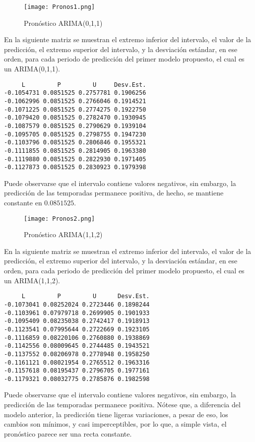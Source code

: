 \documentclass{article}
\theoremstyle{remark}
\begin{document}
\begin{figure}[H] 
\centering
\texttt{[image: Pronos1.png]}
\caption{Pronóstico ARIMA(0,1,1)}
\label{Pronos1}
\end{figure}

En la siguiente matriz se muestran el extremo inferior del intervalo, el valor de la predicción,  el extremo superior del intervalo, y la desviación estándar, en ese orden, para cada periodo de predicción del primer modelo propuesto, el cual es un ARIMA(0,1,1).
\begin{verbatim}
     L         P         U     Desv.Est.
-0.1054731 0.0851525 0.2757781 0.1906256
-0.1062996 0.0851525 0.2766046 0.1914521
-0.1071225 0.0851525 0.2774275 0.1922750
-0.1079420 0.0851525 0.2782470 0.1930945
-0.1087579 0.0851525 0.2790629 0.1939104
-0.1095705 0.0851525 0.2798755 0.1947230
-0.1103796 0.0851525 0.2806846 0.1955321
-0.1111855 0.0851525 0.2814905 0.1963380
-0.1119880 0.0851525 0.2822930 0.1971405
-0.1127873 0.0851525 0.2830923 0.1979398
\end{verbatim}
Puede observarse que el intervalo contiene valores negativos, sin embargo, la predicción de las temporadas permanece positiva, de hecho, se mantiene constante en \(0.0851525\).
\begin{figure}[H] 
\centering
\texttt{[image: Pronos2.png]}
\caption{Pronóstico ARIMA(1,1,2)}
\label{Pronos2}
\end{figure}
En la siguiente matriz se muestran el extremo inferior del intervalo, el valor de la predicción,  el extremo superior del intervalo, y la desviación estándar, en ese orden, para cada periodo de predicción del primer modelo propuesto, el cual es un ARIMA(1,1,2).
\begin{verbatim}
     L         P         U      Desv.Est.
-0.1073041 0.08252024 0.2723446 0.1898244
-0.1103961 0.07979718 0.2699905 0.1901933
-0.1095409 0.08235038 0.2742417 0.1918913
-0.1123541 0.07995644 0.2722669 0.1923105
-0.1116859 0.08220106 0.2760880 0.1938869
-0.1142556 0.08009645 0.2744485 0.1943521
-0.1137552 0.08206978 0.2778948 0.1958250
-0.1161121 0.08021954 0.2765512 0.1963316
-0.1157618 0.08195437 0.2796705 0.1977161
-0.1179321 0.08032775 0.2785876 0.1982598     
\end{verbatim}
Puede observarse que el intervalo contiene valores negativos, sin embargo, la predicción de las temporadas permanece positiva. Nótese que, a diferencia del modelo anterior, la predicción tiene ligeras variaciones, a pesar de eso, los cambios son mínimos, y casi imperceptibles, por lo que, a simple vista, el pronóstico parece ser una recta constante.
\end{document}
